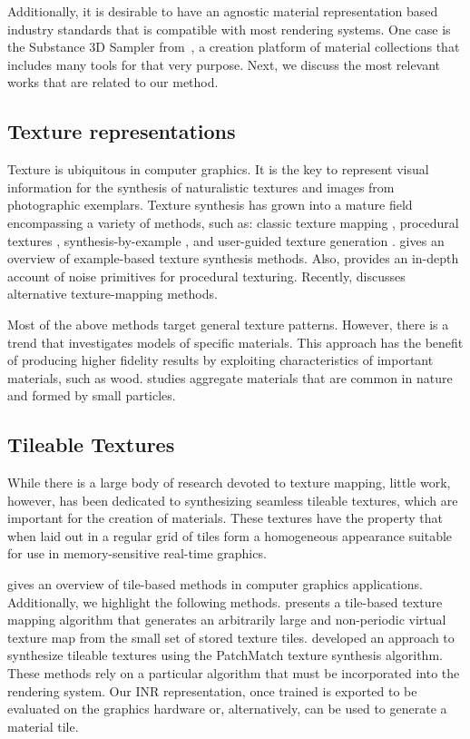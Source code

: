 Additionally, it is desirable to have an agnostic material representation based industry standards that is compatible with most rendering systems. One case is the Substance 3D Sampler from~\citet{substance_sampler}, a creation platform of material collections that includes many tools for that very purpose. 
Next, we discuss the most relevant works that are related to our method.


\subsection{Texture representations}

Texture is ubiquitous in computer graphics. It is the key to represent visual information for the synthesis of naturalistic textures and images from photographic exemplars. Texture synthesis has grown into a mature field encompassing a variety of methods, such as: classic texture mapping \cite{blinn76}, procedural textures \cite{perlin-1985}, synthesis-by-example \cite{efros99}, and user-guided texture generation \cite{haeberli90}. \citet{pauly-2009} gives an overview of example-based texture synthesis methods. Also, \citet{etal-2010} provides an in-depth account of noise primitives for procedural texturing.
%
Recently, \citet{rethinkngtex} discusses alternative texture-mapping methods.

Most of the above methods target general texture patterns. However, there is a trend that investigates models of specific materials. This approach has the benefit of producing higher fidelity results by exploiting characteristics of important materials, such as wood.
\citet{dorsey-2004} studies aggregate materials that are common in nature and formed by small particles.

\subsection{Tileable Textures}
While there is a large body of research devoted to texture mapping, little work, however,  has been dedicated to synthesizing seamless tileable textures, which are important for the creation of materials. These textures have the property that when laid out in a regular grid of tiles form a homogeneous appearance suitable for use in memory-sensitive real-time graphics.

\citet{tileinteractive} gives an overview of tile-based methods in computer graphics applications.
%
Additionally, we highlight the following methods. \citet{tilehard} presents a tile-based texture mapping algorithm that generates an arbitrarily large and non-periodic virtual texture map from the small set of stored texture tiles. \citet{Moritz2017Texture} developed an approach to synthesize tileable textures using the PatchMatch texture synthesis algorithm.
%
These methods rely on a particular algorithm that must be incorporated into the rendering system. Our INR representation, once trained is exported to be evaluated on the graphics hardware or, alternatively, can be used to generate a material tile.

